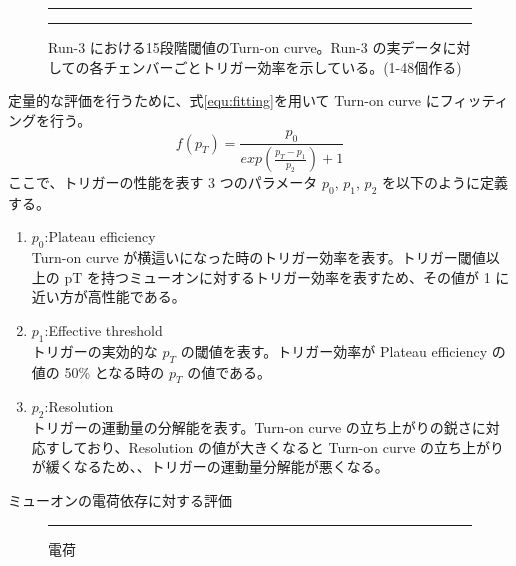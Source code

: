 \begin{figure}
    \centering
    \begin{minipage}[b]{0.4\linewidth}
        \centering
        \rule{6cm}{4cm}
        \vspace{10pt}
        \subcaption{}
        \label{}
    \end{minipage}
    \hfill
    \begin{minipage}[b]{0.4\linewidth}
        \centering
        \rule{6cm}{4cm}
        \vspace{10pt}
        \subcaption{}
        \label{}
    \end{minipage}
    \caption{Run-3 における15段階閾値のTurn-on curve。Run-3 の実データに対しての各チェンバーごとトリガー効率を示している。(1-48個作る)}
    \label{fig:Run3_15_Data_chamber1}
\end{figure}

定量的な評価を行うために、式\ref{equ:fitting}を用いて Turn-on curve にフィッティングを行う。
\begin{equation}
    f(p_T) = \frac{p_0}{exp(\frac{p_T-p_1}{p_2})+1}
　\label{equ:fitting}
\end{equation}
ここで、トリガーの性能を表す 3 つのパラメータ $p_0$, $p_1$, $p_2$ を以下のように定義する。
\begin{enumerate}\label{table:fitting}
   \item $p_0$:Plateau efficiency\\
   Turn-on curve が横這いになった時のトリガー効率を表す。トリガー閾値以上の pT を持つミューオンに対するトリガー効率を表すため、その値が 1 に近い方が高性能である。
   \item $p_1$:Effective threshold\\
   トリガーの実効的な $p_T$ の閾値を表す。トリガー効率が Plateau efficiency の値の 50\% となる時の $p_T$ の値である。
   \item $p_2$:Resolution\\
   トリガーの運動量の分解能を表す。Turn-on curve の立ち上がりの鋭さに対応すしており、Resolution の値が大きくなると Turn-on curve の立ち上がりが緩くなるため、、トリガーの運動量分解能が悪くなる。
\end{enumerate}


ミューオンの電荷依存に対する評価

\begin{figure}[tb]
  \centering
  \rule{8cm}{6cm}
  \caption{電荷}
  \label{fig:fit_def}
\end{figure}



